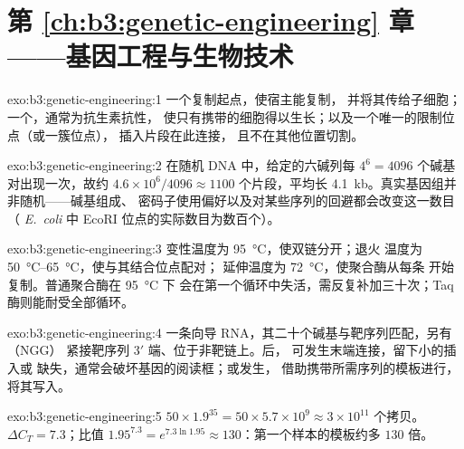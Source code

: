 \section*{第 \ref{ch:b3:genetic-engineering} 章——基因工程与生物技术}

\begin{solution}{exo:b3:genetic-engineering:1}
一个复制起点，使宿主能复制，
并将其传给子细胞；一个，通常为抗生素抗性，
使只有携带的细胞得以生长；以及一个唯一的限制位点（或一簇位点），
插入片段在此连接，
且不在其他位置切割。
\end{solution}

\begin{solution}{exo:b3:genetic-engineering:2}
在随机 DNA 中，给定的六碱列每
$4^{6} = 4096$ 个碱基对出现一次，故约 $4.6\times 10^{6}/4096 \approx 1100$ 个片段，平均长
\qty{4.1}{kb}。真实基因组并非随机——碱基组成、
密码子使用偏好以及对某些序列的回避都会改变这一数目（
\emph{E.~coli} 中 EcoRI 位点的实际数目为数百个）。
\end{solution}

\begin{solution}{exo:b3:genetic-engineering:3}
变性温度为 \qty{95}{\celsius}，使双链分开；退火
温度为 \qtyrange{50}{65}{\celsius}，使与其结合位点配对；
延伸温度为 \qty{72}{\celsius}，使聚合酶从每条
开始复制。普通聚合酶在 \qty{95}{\celsius} 下
会在第一个循环中失活，需反复补加三十次；Taq
酶则能耐受全部循环。
\end{solution}

\begin{solution}{exo:b3:genetic-engineering:4}
一条向导 RNA，其二十个碱基与靶序列匹配，另有 （NGG）
紧接靶序列 3$'$ 端、位于非靶链上。后，
可发生末端连接，留下小的插入或
缺失，通常会破坏基因的阅读框；或发生，
借助携带所需序列的模板进行，
将其写入。
\end{solution}

\begin{solution}{exo:b3:genetic-engineering:5}
$50\times 1.9^{35} = 50\times 5.7\times 10^{9} \approx 3\times 10^{11}$
个拷贝。$\Delta C_{T} = 7.3$；比值 $1.95^{7.3} = e^{7.3\ln 1.95}
\approx 130$：第一个样本的模板约多 $130$ 倍。
\end{solution}

